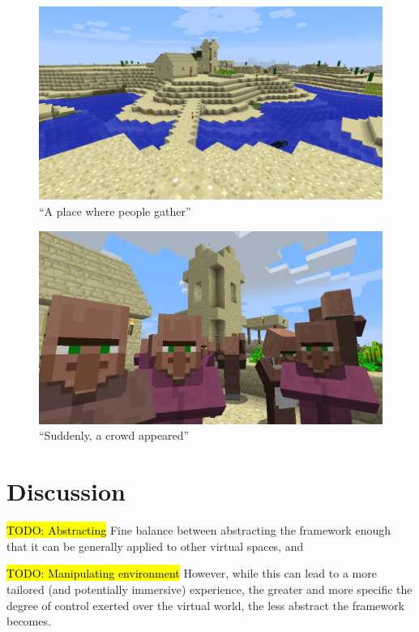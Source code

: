 \documentclass{acm}
\newcommand{\TODO}[1]{\hl{TODO: #1}}
\begin{document}
\begin{figure}
\centering
\includegraphics[scale=.24]{./figures/place.png}
\caption{``A place where people gather''}
\label{figure:gather}
\end{figure}

\begin{figure}
\centering
\includegraphics[scale=0.24]{./figures/villagers.png}
\caption{``Suddenly, a crowd appeared''}
\label{figure:villagers}
\end{figure}


\section{Discussion}
\TODO{Abstracting}
Fine balance between abstracting the framework enough that it can be generally applied to other virtual spaces, and 


\TODO{Manipulating environment}
However, while this can lead to a more tailored (and potentially immersive) experience, the greater and more specific the degree of control exerted over the virtual world, the less abstract the framework becomes.
\end{document}
